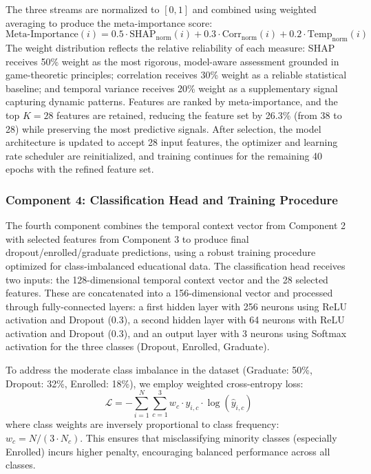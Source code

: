 \documentclass[journal]{IEEEtran}
\begin{document}
The three streams are normalized to $[0, 1]$ and combined using weighted averaging to produce the meta-importance score:
\begin{equation}
\text{Meta-Importance}(i) = 0.5 \cdot \text{SHAP}_{\text{norm}}(i) + 0.3 \cdot \text{Corr}_{\text{norm}}(i) + 0.2 \cdot \text{Temp}_{\text{norm}}(i)
\end{equation}
The weight distribution reflects the relative reliability of each measure: SHAP receives 50\% weight as the most rigorous, model-aware assessment grounded in game-theoretic principles; correlation receives 30\% weight as a reliable statistical baseline; and temporal variance receives 20\% weight as a supplementary signal capturing dynamic patterns. Features are ranked by meta-importance, and the top $K=28$ features are retained, reducing the feature set by 26.3\% (from 38 to 28) while preserving the most predictive signals. After selection, the model architecture is updated to accept 28 input features, the optimizer and learning rate scheduler are reinitialized, and training continues for the remaining 40 epochs with the refined feature set.

\subsubsection{Component 4: Classification Head and Training Procedure}

The fourth component combines the temporal context vector from Component 2 with selected features from Component 3 to produce final dropout/enrolled/graduate predictions, using a robust training procedure optimized for class-imbalanced educational data. The classification head receives two inputs: the 128-dimensional temporal context vector and the 28 selected features. These are concatenated into a 156-dimensional vector and processed through fully-connected layers: a first hidden layer with 256 neurons using ReLU activation and Dropout (0.3), a second hidden layer with 64 neurons with ReLU activation and Dropout (0.3), and an output layer with 3 neurons using Softmax activation for the three classes (Dropout, Enrolled, Graduate).

To address the moderate class imbalance in the dataset (Graduate: 50\%, Dropout: 32\%, Enrolled: 18\%), we employ weighted cross-entropy loss:
\begin{equation}
\mathcal{L} = -\sum_{i=1}^{N} \sum_{c=1}^{3} w_c \cdot y_{i,c} \cdot \log(\hat{y}_{i,c})
\end{equation}
where class weights are inversely proportional to class frequency: $w_c = N/(3 \cdot N_c)$. This ensures that misclassifying minority classes (especially Enrolled) incurs higher penalty, encouraging balanced performance across all classes.
\end{document}
